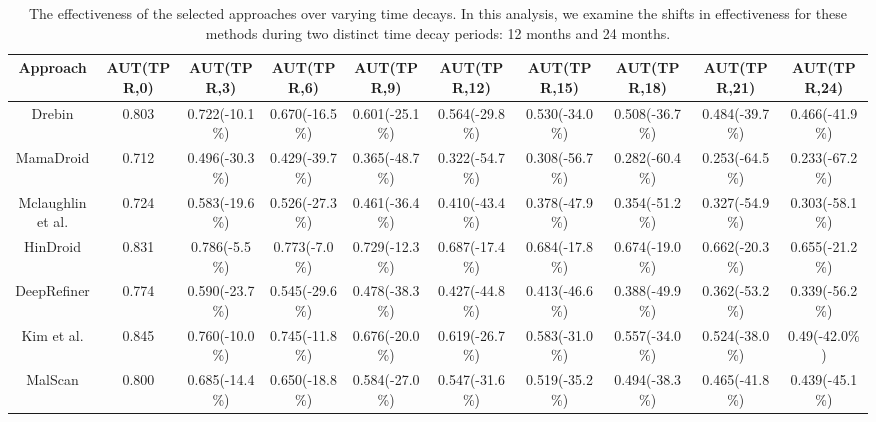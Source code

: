 \begin{table}[t]
    \centering
    \renewcommand{\arraystretch}{1.1}
    \caption{The effectiveness of the selected approaches over varying time decays. In this analysis, we examine the shifts in effectiveness for these methods during two distinct time decay periods: 12 months and 24 months.}
    \begin{adjustbox}{width=0.99\textwidth}
        \begin{tabular}{@{}c|c|c|c|c|c|c|c|c|c@{}}
            \toprule
            \textbf{Approach}         & \textbf{AUT(TPR,0)} & \textbf{AUT(TPR,3)} & \textbf{AUT(TPR,6)} & \textbf{AUT(TPR,9)} & \textbf{AUT(TPR,12)} & \textbf{AUT(TPR,15)} & \textbf{AUT(TPR,18)} & \textbf{AUT(TPR,21)} & \textbf{AUT(TPR,24)} \\ \midrule
            Drebin            & 0.803               & 0.722(-10.1\%)      & 0.670(-16.5\%)      & 0.601(-25.1\%)      & 0.564(-29.8\%)       & 0.530(-34.0\%)       & 0.508(-36.7\%)       & 0.484(-39.7\%)       & 0.466(-41.9\%)       \\ \midrule
            MamaDroid         & 0.712               & 0.496(-30.3\%)      & 0.429(-39.7\%)      & 0.365(-48.7\%)      & 0.322(-54.7\%)       & 0.308(-56.7\%)       & 0.282(-60.4\%)       & 0.253(-64.5\%)       & 0.233(-67.2\%)       \\ \midrule
            Mclaughlin et al. & 0.724               & 0.583(-19.6\%)      & 0.526(-27.3\%)      & 0.461(-36.4\%)      & 0.410(-43.4\%)       & 0.378(-47.9\%)       & 0.354(-51.2\%)       & 0.327(-54.9\%)       & 0.303(-58.1\%)       \\ \midrule
            HinDroid          & 0.831               & 0.786(-5.5\%)       & 0.773(-7.0\%)       & 0.729(-12.3\%)      & 0.687(-17.4\%)       & 0.684(-17.8\%)       & 0.674(-19.0\%)       & 0.662(-20.3\%)       & 0.655(-21.2\%)       \\ \midrule
            DeepRefiner       & 0.774               & 0.590(-23.7\%)      & 0.545(-29.6\%)      & 0.478(-38.3\%)      & 0.427(-44.8\%)       & 0.413(-46.6\%)       & 0.388(-49.9\%)       & 0.362(-53.2\%)       & 0.339(-56.2\%)       \\ \midrule
            Kim et al.        & 0.845               & 0.760(-10.0\%)      & 0.745(-11.8\%)      & 0.676(-20.0\%)      & 0.619(-26.7\%)       & 0.583(-31.0\%)       & 0.557(-34.0\%)       & 0.524(-38.0\%)       & 0.49(-42.0\%)        \\ \midrule
            MalScan           & 0.800               & 0.685(-14.4\%)      & 0.650(-18.8\%)      & 0.584(-27.0\%)      & 0.547(-31.6\%)       & 0.519(-35.2\%)       & 0.494(-38.3\%)       & 0.465(-41.8\%)       & 0.439(-45.1\%)       \\ \midrule

\end{tabular}
\end{adjustbox}
\end{table}
